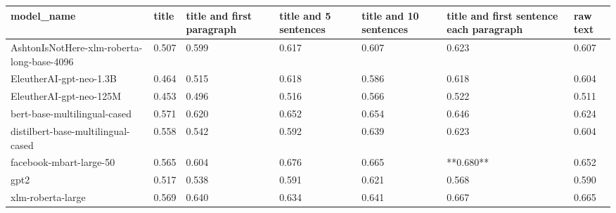 \begin{tabular}{lllllll}
\toprule
                                model\_name & title & title and first paragraph & title and 5 sentences & title and 10 sentences & title and first sentence each paragraph & raw text \\
\midrule
AshtonIsNotHere-xlm-roberta-long-base-4096 & 0.507 &                     0.599 &                 0.617 &                  0.607 &                                   0.623 &    0.607 \\
                   EleutherAI-gpt-neo-1.3B & 0.464 &                     0.515 &                 0.618 &                  0.586 &                                   0.618 &    0.604 \\
                   EleutherAI-gpt-neo-125M & 0.453 &                     0.496 &                 0.516 &                  0.566 &                                   0.522 &    0.511 \\
              bert-base-multilingual-cased & 0.571 &                     0.620 &                 0.652 &                  0.654 &                                   0.646 &    0.624 \\
        distilbert-base-multilingual-cased & 0.558 &                     0.542 &                 0.592 &                  0.639 &                                   0.623 &    0.604 \\
                   facebook-mbart-large-50 & 0.565 &                     0.604 &                 0.676 &                  0.665 &                               **0.680** &    0.652 \\
                                      gpt2 & 0.517 &                     0.538 &                 0.591 &                  0.621 &                                   0.568 &    0.590 \\
                         xlm-roberta-large & 0.569 &                     0.640 &                 0.634 &                  0.641 &                                   0.667 &    0.665 \\
\bottomrule
\end{tabular}
